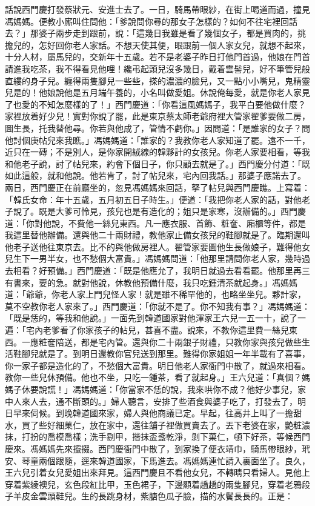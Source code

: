 \begin{showcontents}{}
話說西門慶打發蔡狀元、安進士去了。一日，騎馬帶眼紗，在街上喝道而過，撞見馮媽媽。便教小廝叫住問他：「爹說問你尋的那女子怎樣的？如何不往宅裡回話去？」那婆子兩步走到跟前，說：「這幾日我雖是看了幾個女子，都是買肉的，挑擔兒的，怎好回你老人家話。不想天使其便，眼跟前一個人家女兒，就想不起來，十分人材，屬馬兒的，交新年十五歲。若不是老婆子昨日打他門首過，他娘在門首請進我吃茶，我不得看見他哩！纔弔起頭兒沒多幾日，戴着雲髻兒，好不筆管兒般直縷的身子兒。纏得兩隻腳兒一些些，搽的濃濃的臉兒，又一點小小嘴兒，鬼精靈兒是的！他娘說他是五月端午養的，小名叫做愛姐。休說俺每愛，就是你老人家見了也愛的不知怎麼樣的了！」西門慶道：「你看這風媽媽子，我平白要他做什麼？家裡放着好少兒！實對你說了罷，此是東京蔡太師老爺府裡大管家翟爹要做二房，圖生長，托我替他尋。你若與他成了，管情不虧你。」因問道：「是誰家的女子？問他討個庚帖兒來我瞧。」馮媽媽道：「誰家的？我教你老人家知道了罷。遠不一千，近只在一磚；不是別人，是你家開絨線的韓夥計的女孩兒。你老人家要相看，等我和他老子說，討了帖兒來，約會下個日子，你只顧去就是了。」西門慶分付道：「既如此這般，就和他說。他若肯了，討了帖兒來，宅內回我話。」那婆子應諾去了。兩日，西門慶正在前廳坐的，忽見馮媽媽來回話，拏了帖兒與西門慶瞧。上寫着：「韓氏女命：年十五歲，五月初五日子時生。」便道：「我把你老人家的話，對他老子說了。既是大爹可怜見，孩兒也是有造化的；姐只是家寒，沒辦備的。」西門慶道：「你對他說，不費他一絲兒東西。凡一應衣服、首飾、粧奩、廂櫃等件，都是我這里替他辦備。還與他二十兩財禮，教他家止備女孩兒的鞋腳就是了。臨期還叫他老子送他往東京去。比不的與他做房裡人。翟管家要圖他生長做娘子，難得他女兒生下一男半女，也不愁個大富貴。」馮媽媽問道：「他那里請問你老人家，幾時過去相看？好預備。」西門慶道：「既是他應允了，我明日就過去看看罷。他那里再三有書來，要的急。就對他說，休教他預備什麼，我只吃鍾清茶就起身。」馮媽媽道：「爺爺，你老人家上門兒怪人家！就是雖不稀罕他的，也略坐坐兒。夥計家，莫不空教你老人家來了。」西門慶道：「你就不是了。你不知我有事？」馮媽媽道：「既是恁的，等我和他說。」一面先到韓道國家對他渾家王六兒一五一十，說了一遍：「宅內老爹看了你家孩子的帖兒，甚喜不盡。說來，不教你這里費一絲兒東西。一應粧奩陪送，都是宅內管。還與你二十兩銀子財禮，只教你家與孩兒做些生活鞋腳兒就是了。到明日還教你官兒送到那里。難得你家姐姐一年半載有了喜事，你一家子都是造化的了，不愁個大富貴。明日他老人家衙門中散了，就過來相看。教你一些兒休預備。他也不坐，只吃一鍾茶，看了就起身。」王六兒道：「真個？媽媽子休要說謊！」馮媽媽道：「你當家不恁的說，我來哄你不成？他好少事兒，家中人來人去，通不斷頭的。」婦人聽言，安排了些酒食與婆子吃了，打發去了，明日早來伺候。到晚韓道國來家，婦人與他商議已定。早起，往高井上叫了一擔甜水，買了些好細菓仁，放在家中，還往舖子裡做買賣去了。丟下老婆在家，艷粧濃抹，打扮的喬模喬樣；洗手剔甲，揩抹盃盞乾淨，剝下菓仁，頓下好茶，等候西門慶來。馮媽媽先來攛掇。西門慶衙門中散了，到家換了便衣靖巾，騎馬帶眼紗，玳安、琴童兩個跟隨，逕來韓道國家，下馬進去。馮媽媽連忙請入裏面坐了。良久，王六兒引着女兒愛姐出來拜見。這西門慶且不看他女兒，不轉睛只看婦人。見他上穿着紫綾襖兒，玄色段紅比甲，玉色裙子，下邊顯着趫趫的兩隻腳兒，穿着老鴉段子羊皮金雲頭鞋兒。生的長跳身材，紫膅色瓜子臉，描的水鬢長長的。正是：


\end{showcontents}
